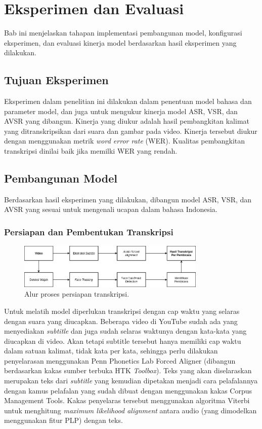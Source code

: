 \chapter{Eksperimen dan Evaluasi}

Bab ini menjelaskan tahapan implementasi pembangunan model, konfigurasi eksperimen, dan evaluasi kinerja model berdasarkan hasil eksperimen yang dilakukan.


\section{Tujuan Eksperimen}

Eksperimen dalam penelitian ini dilakukan dalam penentuan model bahasa dan parameter model, dan juga untuk mengukur kinerja model ASR, VSR, dan AVSR yang dibangun. Kinerja yang diukur adalah hasil pembangkitan kalimat yang ditranskripsikan dari suara dan gambar pada video. Kinerja tersebut diukur dengan menggunakan metrik \textit{word error rate} (WER). Kualitas pembangkitan transkripsi dinilai baik jika memilki WER yang rendah.


\section{Pembangunan Model}
\label{sec:pembangunan-model}

Berdasarkan hasil eksperimen yang dilakukan, dibangun model ASR, VSR, dan AVSR yang sesuai untuk mengenali ucapan dalam bahasa Indonesia.


\subsection{Persiapan dan Pembentukan Transkripsi}

\begin{figure}[h]
    \centering
    \includegraphics[width=0.8\textwidth]{resources/images/proses-persiapan-transkripsi.png}
    \caption{Alur proses persiapan transkripsi.}
    \label{fig:proses-persiapan-transkripsi}
\end{figure}

Untuk melatih model diperlukan transkripsi dengan cap waktu yang selaras dengan suara yang diucapkan. Beberapa video di YouTube sudah ada yang menyediakan \textit{subtitle} dan juga sudah selaras waktunya dengan kata-kata yang diucapkan di video. Akan tetapi subtitle tersebut hanya memiliki cap waktu dalam satuan kalimat, tidak kata per kata, sehingga perlu dilakukan penyelarasan menggunakan Penn Phonetics Lab Forced Aligner (dibangun berdasarkan kakas sumber terbuka HTK \textit{Toolbox}). Teks yang akan diselaraskan merupakan teks dari \textit{subtitle} yang kemudian dipetakan menjadi cara pelafalannya dengan kamus pelafalan yang sudah dibuat dengan menggunakan kakas Corpus Management Tools. Kakas penyelaras tersebut menggunakan algoritma Viterbi untuk menghitung \textit{maximum likelihood alignment} antara audio (yang dimodelkan menggunakan fitur PLP) dengan teks.


